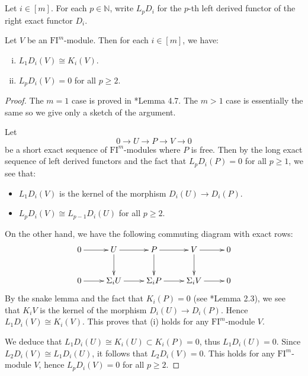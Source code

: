 \documentclass{amsart}
\numberwithin{equation}{section}
\newcommand{\N}{{\mathbb{N}}}
\newcommand{\FI}{{\mathrm{FI}}}
\begin{document}
\subsection{}
Let $i\in [m]$. For each $p\in \N$, write $L_p D_i$ for the $p$-th left derived functor of the right exact functor $D_i$. 

\begin{lemma} \label{2-row}
   Let $V$ be an $\FI^m$-module. Then for each $i\in [m]$, we have:
   \begin{enumerate}[(i)]
      \item $L_1 D_i (V) \cong K_i(V)$.
      \item $L_p D_i (V) = 0$ for all $p\geqslant 2$.
   \end{enumerate}
\end{lemma}

\begin{proof}
   The $m=1$ case is proved in \cite{ce}*{Lemma 4.7}. The $m>1$ case is essentially the same so we give only a sketch of the argument.

   Let 
   \[ 0 \to U \to P \to V \to 0 \] 
   be a short exact sequence of $\FI^m$-modules where $P$ is free. Then by the long exact sequence of left derived functors and the fact that $L_p D_i(P)=0$ for all $p\geqslant 1$, we see that: 
   \begin{itemize}
      \item $L_1 D_i(V)$ is the kernel of the morphism $D_i(U) \to D_i(P)$.
      \item $L_p D_i(V) \cong L_{p-1} D_i(U)$ for all $p\geqslant 2$.
   \end{itemize}
   
   On the other hand, we have the following commuting diagram with exact rows:
   \[ \xymatrix{ 
      0 \ar[r] & U \ar[r] \ar[d] & P \ar[r] \ar[d] & V \ar[r] \ar[d] & 0 \\
   0 \ar[r] & \Sigma_i U \ar[r] & \Sigma_i P \ar[r] & \Sigma_i V \ar[r] & 0 
   } \] 
   By the snake lemma and the fact that $K_i(P)=0$ (see \cite{liyu}*{Lemma 2.3}), we see that $K_iV$ is the kernel of the morphism $D_i(U)\to D_i(P)$. Hence $L_1 D_i(V) \cong K_i(V)$. This proves that (i) holds for any $\FI^m$-module $V$.

   We deduce that $L_1 D_i(U) \cong K_i(U) \subset K_i(P) = 0$, thus $L_1 D_i(U) = 0$. Since $L_2 D_i(V) \cong L_1 D_i(U)$, it follows that $L_2 D_i(V) = 0$. This holds for any $\FI^m$-module $V$, hence $L_p D_i(V)=0$ for all $p\geqslant 2$. 
\end{proof}
\end{document}
